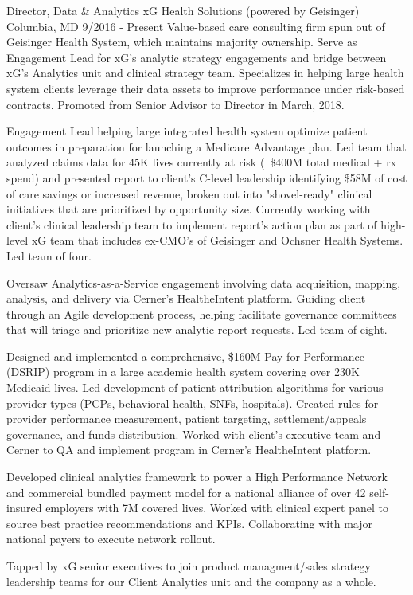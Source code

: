 \begin{cventries}
  \cvexperience
    {Director, Data \& Analytics}
    {xG Health Solutions (powered by Geisinger)}
    {Columbia, MD}
    {9/2016 - Present}
    {Value-based care consulting firm spun out of Geisinger Health System, which maintains majority ownership. Serve as Engagement Lead for xG’s analytic strategy engagements and bridge between xG’s Analytics unit and clinical strategy team. Specializes in helping large health system clients leverage their data assets to improve performance under risk-based contracts. Promoted from Senior Advisor to Director in March, 2018.}
    {
      \begin{cvitems}
              \item {Engagement Lead helping large integrated health system optimize patient outcomes in preparation for launching a Medicare Advantage plan. Led team that analyzed claims data for 45K lives currently at risk (~\$400M total medical + rx spend) and presented report to client's C-level leadership identifying \$58M of cost of care savings or increased revenue, broken out into "shovel-ready" clinical initiatives that are prioritized by opportunity size. Currently working with client's clinical leadership team to implement report's action plan as part of high-level xG team that includes  ex-CMO's of Geisinger and Ochsner Health Systems. Led team of four.}
                 \item {Oversaw Analytics-as-a-Service engagement involving data acquisition, mapping, analysis, and delivery via Cerner's HealtheIntent platform. Guiding client through an Agile development process, helping facilitate governance committees that will triage and prioritize new analytic report requests. Led team of eight.}
              \item {Designed and implemented a comprehensive, \$160M Pay-for-Performance (DSRIP) program in a large academic health system covering over 230K Medicaid lives. Led development of patient attribution algorithms for various provider types (PCPs, behavioral health, SNFs, hospitals). Created rules for provider performance measurement, patient targeting, settlement/appeals governance, and funds distribution. Worked with client's executive team and Cerner to QA and implement program in Cerner's HealtheIntent platform. }
               \item {Developed clinical analytics framework to power a High Performance Network and commercial bundled payment model for a national alliance of over 42 self-insured employers with 7M covered lives. Worked with clinical expert panel to source best practice recommendations and KPIs. Collaborating with major national payers to execute network rollout.}
               \item {Tapped by xG senior executives to join product managment/sales strategy leadership teams for our Client Analytics unit and the company as a whole.}
             \end{cvitems}
    }


\end{cventries}
